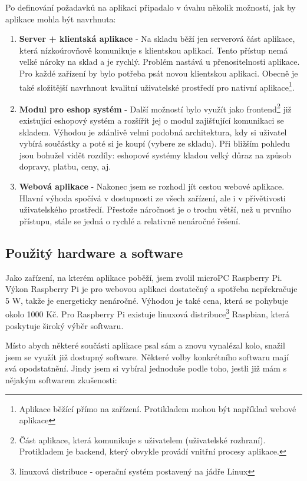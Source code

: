 \documentclass[12pt, a4paper, oneside]{article}
\begin{document}
Po definování požadavků na aplikaci připadalo v úvahu několik možností, jak by aplikace mohla být navrhnuta:

\begin{enumerate}
\item \textbf{Server + klientská aplikace} - Na skladu běží jen serverová část aplikace, která nízkoúrovňově komunikuje s klientskou aplikací. Tento přístup nemá velké nároky na sklad a je rychlý. Problém nastává u přenositelnosti aplikace. Pro každé zařízení by bylo potřeba psát novou klientskou aplikaci. Obecně je také složitější navrhnout kvalitní uživatelské prostředí pro nativní aplikace\footnote{Aplikace běžící přímo na zařízení. Protikladem mohou být například webové aplikace}.
\item \textbf{Modul pro eshop systém} - Další možností bylo využít jako frontend\footnote{Část aplikace, která komunikuje s uživatelem (uživatelské rozhraní). Protikladem je backend, který obvykle provádí vnitřní procesy aplikace.} již existující eshopový systém a rozšířít jej o modul zajišťující komunikaci se skladem. Výhodou je zdánlivě velmi podobná architektura, kdy si uživatel vybírá součástky a poté si je koupí (vybere ze skladu). Při bližším pohledu jsou bohužel vidět rozdíly: eshopové systémy kladou velký důraz na způsob dopravy, platbu, ceny, aj.
\item \textbf{Webová aplikace} - Nakonec jsem se rozhodl jít cestou webové aplikace. Hlavní výhoda spočívá v dostupnosti ze všech zařízení, ale i v přívětivosti uživatelského prostředí. Přestože náročnost je o trochu větší, než u prvního přístupu, stále se jedná o rychlé a relativně nenáročné řešení.
\end{enumerate}


\subsection{Použitý hardware a software}

Jako zařízení, na kterém aplikace poběží, jsem zvolil microPC Raspberry Pi. Výkon Raspberry Pi je pro webovou aplikaci dostatečný a spotřeba nepřekračuje 5 W, takže je energeticky nenáročné. Výhodou je také cena, která se pohybuje okolo 1000 Kč. Pro Raspberry Pi existuje linuxová distribuce\footnote{linuxová distribuce - operační systém postavený na jádře Linux} Raspbian\cite{raspbian}, která poskytuje široký výběr softwaru.

Místo abych některé součásti aplikace psal sám a znovu vynalézal kolo, snažil jsem se využít již dostupný software. Některé volby konkrétního softwaru mají svá opodstatnění. Jindy jsem si vybíral jednoduše podle toho, jestli již mám s nějakým softwarem zkušenosti:
\end{document}
